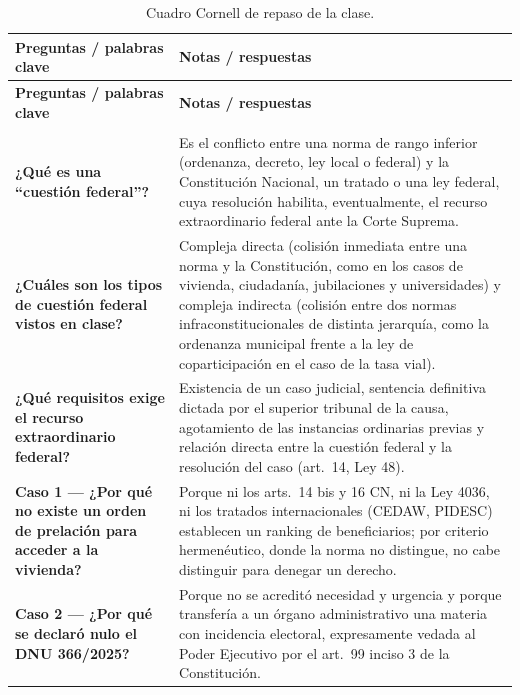 \documentclass[12pt,oneside]{book}
\begin{document}
\begin{longtable}{
    >{\raggedright\arraybackslash}p{}
    >{\raggedright\arraybackslash}p{}
}
\caption{Cuadro Cornell de repaso de la clase.} \\
\toprule
\textbf{Preguntas / palabras clave} & \textbf{Notas / respuestas} \\
\midrule
\endfirsthead

\toprule
\textbf{Preguntas / palabras clave} & \textbf{Notas / respuestas} \\
\midrule
\endhead

\midrule
\multicolumn{2}{r}{\textit{Continúa en la página siguiente}} \\
\endfoot

\bottomrule
\endlastfoot


\textbf{¿Qué es una ``cuestión federal''?} &
Es el conflicto entre una norma de rango inferior (ordenanza, decreto, ley local o federal) y la Constitución Nacional, un tratado o una ley federal, cuya resolución habilita, eventualmente, el recurso extraordinario federal ante la Corte Suprema. \\

\textbf{¿Cuáles son los tipos de cuestión federal vistos en clase?} &
Compleja directa (colisión inmediata entre una norma y la Constitución, como en los casos de vivienda, ciudadanía, jubilaciones y universidades) y compleja indirecta (colisión entre dos normas infraconstitucionales de distinta jerarquía, como la ordenanza municipal frente a la ley de coparticipación en el caso de la tasa vial). \\

\textbf{¿Qué requisitos exige el recurso extraordinario federal?} &
Existencia de un caso judicial, sentencia definitiva dictada por el superior tribunal de la causa, agotamiento de las instancias ordinarias previas y relación directa entre la cuestión federal y la resolución del caso (art.\ 14, Ley 48). \\

\textbf{Caso 1 --- ¿Por qué no existe un orden de prelación para acceder a la vivienda?} &
Porque ni los arts.\ 14 bis y 16 CN, ni la Ley 4036, ni los tratados internacionales (CEDAW, PIDESC) establecen un ranking de beneficiarios; por criterio hermenéutico, donde la norma no distingue, no cabe distinguir para denegar un derecho. \\

\textbf{Caso 2 --- ¿Por qué se declaró nulo el DNU 366/2025?} &
Porque no se acreditó necesidad y urgencia y porque transfería a un órgano administrativo una materia con incidencia electoral, expresamente vedada al Poder Ejecutivo por el art.\ 99 inciso 3 de la Constitución. \\


\end{longtable}
\end{document}

